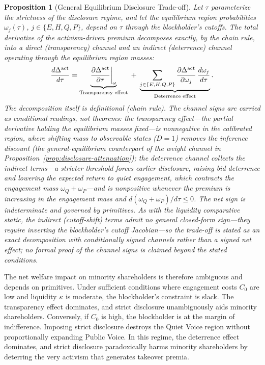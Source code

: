 \documentclass[11pt]{article}
\newtheorem{proposition}{Proposition}
\newcommand{\1}{\mathbf{1}}
\begin{document}
\begin{proposition}[General Equilibrium Disclosure Trade-off]
\label{prop:ge-disclosure}
Let $\tau$ parameterize the strictness of the disclosure regime, and let the equilibrium region probabilities $\omega_j(\tau)$, $j\in\{E,H,Q,P\}$, depend on $\tau$ through the blockholder's cutoffs. The total derivative of the activism-driven premium decomposes \emph{exactly}, by the chain rule, into a direct (transparency) channel and an indirect (deterrence) channel operating through the equilibrium region masses:
\begin{equation}
\label{eq:ge-decomp}
\frac{d \Delta^{\textup{act}}}{d \tau}
= \underbrace{\frac{\partial \Delta^{\textup{act}}}{\partial \tau}\bigg|_{\omega}}_{\text{Transparency effect}}
\;+\; \underbrace{\sum_{j\in\{E,H,Q,P\}} \frac{\partial \Delta^{\textup{act}}}{\partial \omega_j}\,\frac{d \omega_j}{d \tau}}_{\text{Deterrence effect}} .
\end{equation}
The decomposition itself is definitional (chain rule). The channel signs are carried as conditional readings, not theorems: the transparency effect---the partial derivative holding the equilibrium masses fixed---is nonnegative \emph{in the calibrated region}, where shifting mass to observable states ($D=1$) removes the inference discount (the general-equilibrium counterpart of the weight channel in Proposition~\ref{prop:disclosure-attenuation}); the deterrence channel collects the indirect terms---a stricter threshold forces earlier disclosure, raising bid deterrence and lowering the expected return to quiet engagement, which contracts the engagement mass $\omega_Q+\omega_P$---and is nonpositive \emph{whenever} the premium is increasing in the engagement mass and $d(\omega_Q+\omega_P)/d\tau\le 0$. The \emph{net} sign is indeterminate and governed by primitives. As with the liquidity comparative static, the indirect (cutoff-shift) terms admit no general closed-form sign---they require inverting the blockholder's cutoff Jacobian---so the trade-off is stated as an exact decomposition with conditionally signed channels rather than a signed net effect; no formal proof of the channel signs is claimed beyond the stated conditions.
\end{proposition}

The net welfare impact on minority shareholders is therefore ambiguous and depends on primitives. Under sufficient conditions where engagement costs $C_0$ are low and liquidity $\kappa$ is moderate, the blockholder's constraint is slack. The transparency effect dominates, and strict disclosure unambiguously aids minority shareholders. Conversely, if $C_0$ is high, the blockholder is at the margin of indifference. Imposing strict disclosure destroys the Quiet Voice region without proportionally expanding Public Voice. In this regime, the deterrence effect dominates, and strict disclosure paradoxically harms minority shareholders by deterring the very activism that generates takeover premia.
\end{document}
